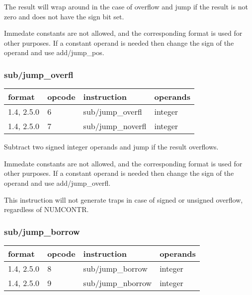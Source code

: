 \documentclass[forwardcom.tex]{subfiles}
\begin{document}
The result will wrap around in the case of overflow and jump if the result is not zero and does not have the sign bit set.
\vspace{2mm}

Immedate constants are not allowed, and the corresponding format is used for other purposes.
If a constant operand is needed then change the sign of the operand and use add/jump\_pos. 

\subsubsection{sub/jump\_overfl}
\label{table:subJumpOverflInstruction}
\begin{tabular}{|p{16mm}|p{12mm}|p{60mm}|p{50mm}|}
\hline
\bfseries format & \bfseries opcode & \bfseries instruction & \bfseries operands \\ \hline
1.4, 2.5.0 &  6 & sub/jump\_overfl & integer \\ \hline
1.4, 2.5.0 &  7 & sub/jump\_noverfl & integer\\ \hline
\end{tabular}
\vspace{2mm}

Subtract two signed integer operands and jump if the result overflows.
\vspace{2mm}

Immedate constants are not allowed, and the corresponding format is used for other purposes.
If a constant operand is needed then change the sign of the operand and use add/jump\_overfl. 
\vspace{2mm}

This instruction will not generate traps in case of signed or unsigned overflow, regardless of  NUMCONTR.
\vspace{2mm}

\subsubsection{sub/jump\_borrow}
\label{table:subJumpBorrowInstruction}
\begin{tabular}{|p{16mm}|p{12mm}|p{60mm}|p{50mm}|}
\hline
\bfseries format & \bfseries opcode & \bfseries instruction & \bfseries operands \\ \hline
1.4, 2.5.0 &  8 & sub/jump\_borrow & integer \\ \hline
1.4, 2.5.0 &  9 & sub/jump\_nborrow & integer\\ \hline
\end{tabular}
\vspace{2mm}
\end{document}
